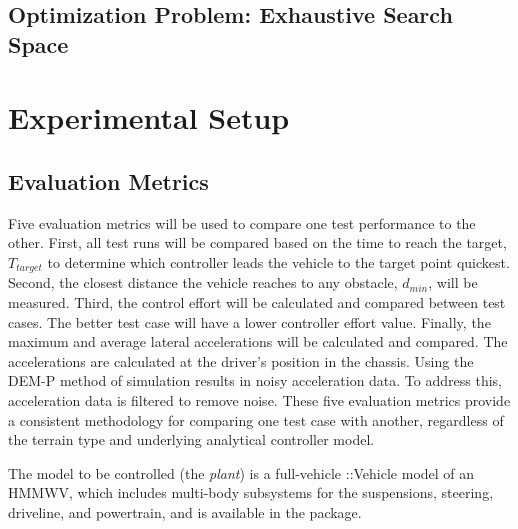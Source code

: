 \documentclass[12pt,onecolumn]{article}
\newcommand{\CHRONO}{{\sffamily{{Chrono}}}}
\newcommand{\ChronoVehicle}{{\sffamily{Chrono}}::Vehicle}
\begin{document}


\subsection{Optimization Problem: Exhaustive Search Space}\label{ss:Optimization}




\section{Experimental Setup}\label{s:ExpSetup}

\subsection{Evaluation Metrics}\label{ss:Metrics}
Five evaluation metrics will be used to compare one test performance to the other. First, all test runs will be compared based on the time to reach the target, $T_{target}$ to determine which controller leads the vehicle to the target point quickest. Second, the closest distance the vehicle reaches to any obstacle, $d_{min}$, will be measured. Third, the control effort will be calculated and compared between test cases. The better test case will have a lower controller effort value. Finally, the maximum and average lateral accelerations will be calculated and compared. The accelerations are calculated at the driver's position in the chassis. Using the DEM-P method of simulation results in noisy acceleration data. To address this, acceleration data is filtered to remove noise. These five evaluation metrics provide a consistent methodology for comparing one test case with another, regardless of the terrain type and underlying analytical controller model.

The model to be controlled (the {\em plant}) is a full-vehicle {\ChronoVehicle} model of an HMMWV, which includes multi-body subsystems for the suspensions, steering, driveline, and powertrain, and is available in the {\CHRONO} package.
\end{document}
